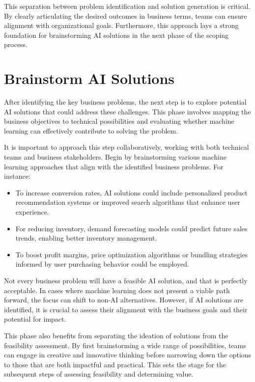 \documentclass[12pt,openany]{book}
\begin{document}
This separation between problem identification and solution generation is critical. By clearly articulating the desired outcomes in business terms, teams can ensure alignment with organizational goals. Furthermore, this approach lays a strong foundation for brainstorming AI solutions in the next phase of the scoping process.


\section{Brainstorm AI Solutions}

After identifying the key business problems, the next step is to explore potential AI solutions that could address these challenges. This phase involves mapping the business objectives to technical possibilities and evaluating whether machine learning can effectively contribute to solving the problem.
\newline

It is important to approach this step collaboratively, working with both technical teams and business stakeholders. Begin by brainstorming various machine learning approaches that align with the identified business problems. For instance:
\begin{itemize}
    \item To increase conversion rates, AI solutions could include personalized product recommendation systems or improved search algorithms that enhance user experience.
    \item For reducing inventory, demand forecasting models could predict future sales trends, enabling better inventory management.
    \item To boost profit margins, price optimization algorithms or bundling strategies informed by user purchasing behavior could be employed.
\end{itemize}

Not every business problem will have a feasible AI solution, and that is perfectly acceptable. In cases where machine learning does not present a viable path forward, the focus can shift to non-AI alternatives. However, if AI solutions are identified, it is crucial to assess their alignment with the business goals and their potential for impact.

This phase also benefits from separating the ideation of solutions from the feasibility assessment. By first brainstorming a wide range of possibilities, teams can engage in creative and innovative thinking before narrowing down the options to those that are both impactful and practical. This sets the stage for the subsequent steps of assessing feasibility and determining value.
\end{document}
